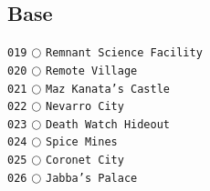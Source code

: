\documentclass[a4paper,landscape]{article}
\begin{document}
\begin{multicols*}{5}
\section{Base} 
\vspace{-2mm} 
\texttt{019} \(\bigcirc\)  \texttt{Remnant Science Facility} \vspace{-0.3mm}\\ 
\texttt{020} \(\bigcirc\)  \texttt{Remote Village} \vspace{-0.3mm}\\ 
\texttt{021} \(\bigcirc\)  \texttt{Maz Kanata’s Castle} \vspace{-0.3mm}\\ 
\texttt{022} \(\bigcirc\)  \texttt{Nevarro City} \vspace{-0.3mm}\\ 
\texttt{023} \(\bigcirc\)  \texttt{Death Watch Hideout} \vspace{-0.3mm}\\ 
\texttt{024} \(\bigcirc\)  \texttt{Spice Mines} \vspace{-0.3mm}\\ 
\texttt{025} \(\bigcirc\)  \texttt{Coronet City} \vspace{-0.3mm}\\ 
\texttt{026} \(\bigcirc\)  \texttt{Jabba’s Palace} \vspace{-0.3mm}\\ 

\end{multicols*}
\end{document}
